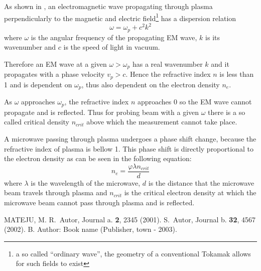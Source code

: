 \documentclass[twoside]{articlek}
\begin{document}
As shown in \cite{mateju}, an electromagnetic wave propagating through plasma perpendicularly to the magnetic and electric field\footnote{a so called ``ordinary wave'', the geometry of a conventional Tokamak allows for such fields to exist} has a dispersion relation
\begin{equation}
    \omega = \omega_p +c^2 k^2
    \label{eq:dispersion}
\end{equation}
where $\omega$ is the angular frequency of the propagating EM wave, $k$ is its wavenumber and $c$ is the speed of light in vacuum.

Therefore an EM wave at a given $\omega>\omega_p$ has a real wavenumber $k$ and it propagates with a phase velocity $v_p>c$. Hence the refractive index $n$ is less than 1 and is dependent on $\omega_p$, thus also dependent on the electron density $n_e$. 

As $\omega$ approaches $\omega_p$, the refractive index $n$ approaches 0 so the EM wave cannot propagate and is reflected. Thus for probing beam with a given $\omega$ there is a so called critical density $n_{crit}$ above which the measurement cannot take place.

A microwave passing through plasma undergoes a phase shift change, because the refractive index of plasma is bellow 1. %
This phase shift is directly proportional to the electron density as can be seen in the following equation:
\begin{equation}
    n_e=\frac{\varphi \lambda n_{crit}}{d}
    \label{eq:ne}
\end{equation}
where $\lambda$ is the wavelength of the microwave, $d$ is the distance that the microwave beam travels through plasma and $n_{crit}$ is the critical electron density at which the microwave beam cannot pass through plasma and is reflected.
\begin{thebibliography}{99}

\leftskip=-5pt \vspace{-0.3truecm}
 MATEJU, M.
 R.~Autor, Journal a. {\bf 2}, 2345 (2001).
 S.~Autor, Journal b. {\bf 32}, 4567 (2002).
 B. Author: Book name (Publisher, town - 2003).
\end{thebibliography}
\end{document}

